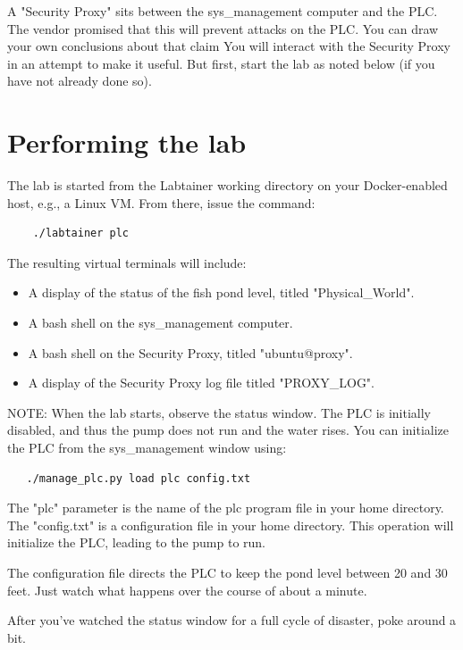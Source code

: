 \documentclass{article}
\begin{document}
A "Security Proxy" sits between the sys\_management computer and the PLC.  The vendor promised
that this will prevent attacks on the PLC.  You can draw your own conclusions about that claim
You will interact with the Security Proxy in an attempt to make it useful.  But first, start the lab
as noted below (if you have not already done so).

\section {Performing the lab}
The lab is started from the Labtainer working
directory on your Docker-enabled host, e.g., a Linux VM.
From there, issue the command:
\begin{verbatim}
    ./labtainer plc
\end{verbatim}
\noindent The resulting virtual terminals will include: 
\begin{itemize}
\item A display of the status of the fish pond level, titled "Physical\_World".
\item A bash shell on the sys\_management computer.
\item A bash shell on the Security Proxy, titled "ubuntu@proxy".
\item A display of the Security Proxy log file titled "PROXY\_LOG".
\end{itemize}
NOTE: When the lab starts, observe the status window. The PLC is initially
disabled, and thus the pump does not run and the water rises.  
You can initialize the PLC from the sys\_management window using:
\begin{verbatim}
   ./manage_plc.py load plc config.txt
\end{verbatim}

\noindent The "plc" parameter is the name of the plc program file in your home directory.
The "config.txt" is a configuration file in your home directory.  This operation
will initialize the PLC, leading to the pump to run.

The configuration file directs the PLC to keep the pond level between 20 and 30 feet.
Just watch what happens over the course of about a minute.

After you've watched the status window for a full cycle of disaster, 
poke around a bit.  

\renewcommand\thesubsubsection{}
\end{document}
